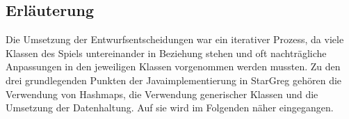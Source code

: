 \subsection{Erläuterung}
\label{sub:fachkonzept-implementierung-erläuterung}


Die Umsetzung der Entwurfsentscheidungen war ein iterativer Prozess, da viele Klassen des Spiels untereinander in Beziehung stehen und oft nachträgliche Anpassungen in den jeweiligen Klassen vorgenommen werden mussten. Zu den drei grundlegenden Punkten der Javaimplementierung in StarGreg gehören die Verwendung von Hashmaps, die Verwendung generischer Klassen und die Umsetzung der Datenhaltung. Auf sie wird im Folgenden näher eingegangen.







\autorende{}